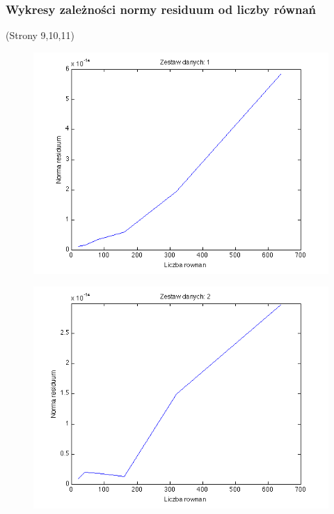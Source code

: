 \documentclass[11pt]{article} %
\begin{document}
\subsubsection{Wykresy zależności normy residuum od liczby równań}
(Strony 9,10,11)
\begin{figure}
\includegraphics{zestaw1}
\end{figure}
\begin{figure}
\includegraphics{zestaw2}
\end{figure}
\end{document}
